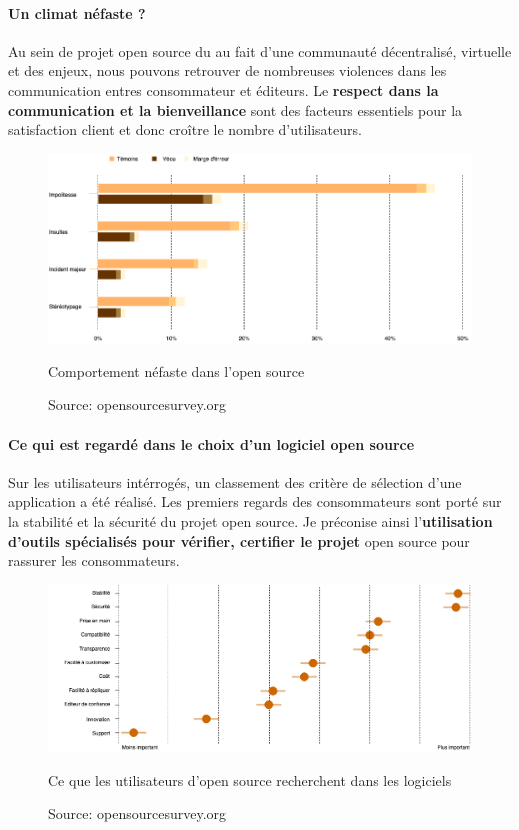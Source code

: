			\paragraph{Un climat néfaste ?\\}

				Au sein de projet open source du au fait d'une communauté décentralisé, virtuelle et des enjeux, nous pouvons retrouver de nombreuses violences dans les communication entres consommateur et éditeurs. Le \textbf{respect dans la communication et la bienveillance} sont des facteurs essentiels pour la satisfaction client et donc croître le nombre d'utilisateurs.

				\begin{figure}[ht]
					\center
					\includegraphics[scale=0.50]{./img/ng_behaviour_os.png}
					\caption{Comportement néfaste dans l'open source}
   					\caption*{\color{silver}Source: opensourcesurvey.org}
				\end{figure}

			\paragraph{Ce qui est regardé dans le choix d'un logiciel open source\\}

				Sur les utilisateurs intérrogés, un classement des critère de sélection d'une application a été réalisé. Les premiers regards des consommateurs sont porté sur la stabilité et la sécurité du projet open source. Je préconise ainsi l'\textbf{utilisation d'outils spécialisés pour vérifier, certifier le projet} open source pour rassurer les consommateurs.

				\begin{figure}[ht]
					\center
					\includegraphics[scale=0.50]{./img/value_soft_os.png}
					\caption{Ce que les utilisateurs d'open source recherchent dans les logiciels}
   					\caption*{\color{silver}Source: opensourcesurvey.org}
				\end{figure}



